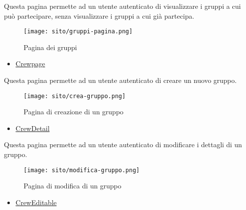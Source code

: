 \label{par:Gruppi}
Questa pagina permette ad un utente autenticato di visualizzare i gruppi a cui può partecipare, senza visualizzare i gruppi a cui già partecipa. 
\begin{figure}[H] 
    \centering 
    \texttt{[image: sito/gruppi-pagina.png]} 
    \caption{Pagina dei gruppi}
\end{figure}
\begin{itemize}
    \item \hyperref[par:Crewpage]{Crewpage}
\end{itemize}

\label{par:Crea nuovo gruppo}

Questa pagina permette ad un utente autenticato di creare un nuovo gruppo. 
\begin{figure}[H] 
    \centerline{\texttt{[image: sito/crea-gruppo.png]}}     
    \caption{Pagina di creazione di un gruppo}
\end{figure}
\begin{itemize}
    \item \hyperref[par:CrewDetail]{CrewDetail}
\end{itemize}

Questa pagina permette ad un utente autenticato di modificare i dettagli di un gruppo. 
\begin{figure}[H] 
    \centerline{\texttt{[image: sito/modifica-gruppo.png]}} 
    \caption{Pagina di modifica di un gruppo}
\end{figure}
\begin{itemize}
    \item \hyperref[par:CrewEditable]{CrewEditable}
\end{itemize}

